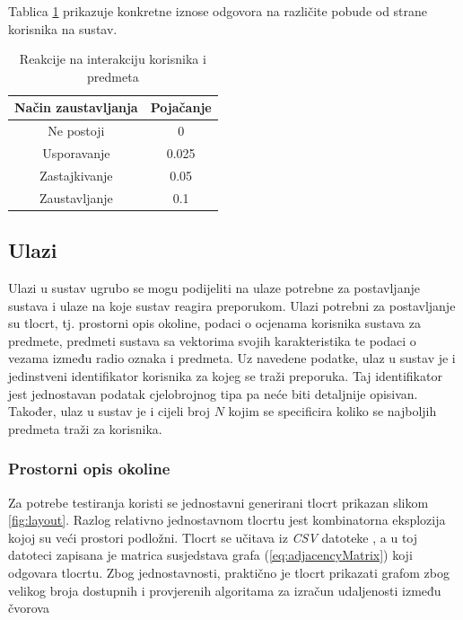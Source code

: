 \documentclass[times, utf8, diplomski, numeric]{fer}
\begin{document}
Tablica \ref{tbl:reinforcement} prikazuje konkretne iznose odgovora na različite
pobude od strane korisnika na sustav.

\begin{table}[!htb]
	\caption{Reakcije na interakciju korisnika i predmeta}
	\label{tbl:reinforcement}
	\centering
	\begin{tabular}{|c|c|} \hline		
		Način zaustavljanja & Pojačanje\\ \hline
		Ne postoji & 0\\
		Usporavanje & 0.025\\
		Zastajkivanje & 0.05\\
		Zaustavljanje & 0.1\\ \hline
	\end{tabular}
\end{table}


\subsection{Ulazi}
Ulazi u sustav ugrubo se mogu podijeliti na ulaze potrebne za postavljanje
sustava i ulaze na koje sustav reagira preporukom. Ulazi potrebni za
postavljanje su tlocrt, tj. prostorni opis okoline, podaci o ocjenama korisnika
sustava za predmete, predmeti sustava sa vektorima svojih karakteristika te
podaci o vezama između radio oznaka i predmeta. Uz navedene podatke, ulaz u
sustav je i jedinstveni identifikator korisnika za kojeg se traži preporuka. Taj
identifikator jest jednostavan podatak cjelobrojnog tipa pa neće biti detaljnije
opisivan. Također, ulaz u sustav je i cijeli broj $N$ kojim se specificira
koliko se najboljih predmeta traži za korisnika.

\subsubsection{Prostorni opis okoline}
Za potrebe testiranja koristi se jednostavni generirani tlocrt prikazan slikom
\ref{fig:layout}. Razlog relativno jednostavnom tlocrtu jest kombinatorna
eksplozija kojoj su veći prostori podložni. Tlocrt se učitava iz \emph{CSV}
datoteke , a u toj datoteci zapisana je matrica
susjedstava grafa (\ref{eq:adjacencyMatrix}) koji odgovara tlocrtu. Zbog
jednostavnosti, praktično je tlocrt prikazati grafom zbog velikog broja
dostupnih i provjerenih algoritama za izračun udaljenosti između čvorova
\end{document}
